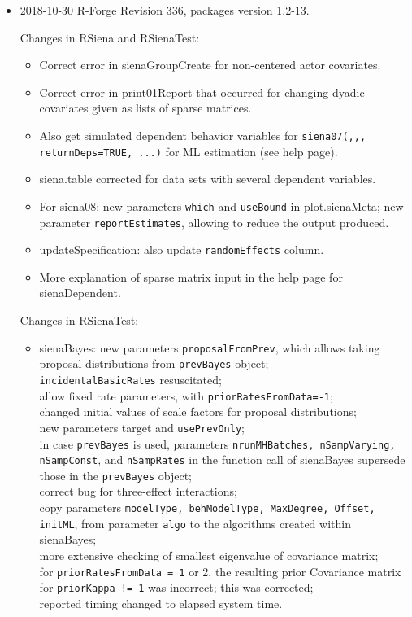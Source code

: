 \documentclass[a4paper,fleqn,11pt]{article}
\newcommand{\+}{\, + \,}
\begin{document}
\begin{small}
\begin{itemize}
\item 2018-10-30 R-Forge Revision 336, packages version 1.2-13.

Changes in RSiena and RSienaTest:
\begin{itemize}
   \item Correct error in \textsf{sienaGroupCreate} for non-centered actor covariates.
   \item Correct error in \textsf{print01Report} that occurred for changing dyadic covariates
     given as lists of sparse matrices.
   \item Also get simulated dependent behavior variables for
     \texttt{siena07(,,, returnDeps=TRUE, ...)} for ML estimation (see help page).
   \item \textsf{siena.table} corrected for data sets with several dependent variables.
   \item For \textsf{siena08}: new parameters \texttt{which} and \texttt{useBound}
   in \textsf{plot.sienaMeta};
     new parameter \texttt{reportEstimates}, allowing to reduce
     the output produced.
   \item \textsf{updateSpecification}: also update \texttt{randomEffects} column.
   \item More explanation of sparse matrix input in the help page for \textsf{sienaDependent}.
\end{itemize}

Changes in RSienaTest:
\begin{itemize}
   \item \textsf{sienaBayes}: new parameters \texttt{proposalFromPrev}, which allows
     taking proposal distributions from \texttt{prevBayes} object;\\
     \texttt{incidentalBasicRates} resuscitated;\\
     allow fixed rate parameters, with \texttt{priorRatesFromData=-1};\\
     changed initial values of scale factors for proposal distributions;\\
     new parameters target and \texttt{usePrevOnly};\\
     in case \texttt{prevBayes} is used, parameters \texttt{nrunMHBatches, nSampVarying, nSampConst},
     and \texttt{nSampRates} in the function call of \textsf{sienaBayes} supersede those
     in the \texttt{prevBayes} object;\\
     correct bug for three-effect interactions;\\
     copy parameters \texttt{modelType, behModelType, MaxDegree, Offset, initML},
     from parameter \texttt{algo} to the algorithms created within \textsf{sienaBayes};\\
     more extensive checking of smallest eigenvalue of covariance matrix;\\
     for \texttt{priorRatesFromData = 1} or 2, the resulting prior Covariance
     matrix for \texttt{priorKappa != 1}
     was incorrect; this was corrected;\\
     reported timing changed to elapsed system time.
\end{itemize}


\end{itemize}
\end{small}
\end{document}
